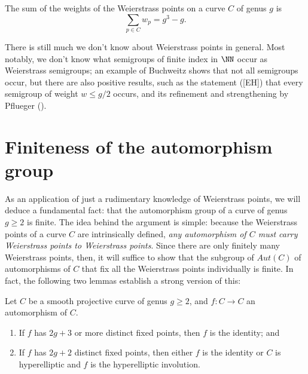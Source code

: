 \begin{theorem}\label{plucker formula}
The sum of the weights of the Weierstrass points on a curve $C$ of genus $g$ is
$$
\sum_{p \in C} w_p = g^3-g.
$$
\end{theorem}

There is still much we don't know about Weierstrass points in general. Most notably, we don't know what semigroups of finite index in $\NN$ occur as Weierstrass semigroups; an example of Buchweitz shows that not all semigroups occur, but there are also positive results, such as the statement ([EH]) that every semigroup of weight $w \leq g/2$ occurs, and its refinement and strengthening by Pflueger (\cite{**}).

\section{Finiteness of the automorphism group}

As an application of just a rudimentary knowledge of Weierstrass points, we will deduce a fundamental fact: that the automorphism group of a curve of genus $g\geq 2$ is finite. The idea behind the argument is simple: because the Weierstrass points of a curve $C$ are intrinsically defined, \emph{any automorphism of $C$ must carry Weierstrass points to Weierstrass points}. Since there are only finitely many Weierstrass points, then, it will suffice to show that the subgroup of $Aut(C)$ of automorphisms of $C$ that fix all the Weierstrass points individually is finite. In fact, the following two lemmas establish a strong version of this:

\begin{lemma}
Let $C$ be a smooth projective curve of genus $g \geq 2$, and $f: C \to C$ an automorphism of $C$.
\begin{enumerate}
\item If $f$ has $2g+3$ or more distinct fixed points, then $f$ is the identity; and
\item If $f$ has $2g+2$ distinct fixed points, then either $f$ is the identity or $C$ is hyperelliptic and $f$ is the hyperelliptic involution.
\end{enumerate}
\end{lemma}

